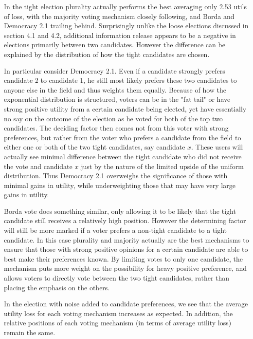 \documentclass[11pt]{scrartcl}
\begin{document}
In the tight election plurality actually performs the best averaging only 2.53 utils of loss, with the majority voting mechanism closely following, and Borda and Democracy 2.1 trailing behind. Surprisingly unlike the loose elections discussed in section 4.1 and 4.2, additional information release appears to be a negative in elections primarily between two candidates. However the difference can be explained by the distribution of how the tight candidates are chosen.

In particular consider Democracy 2.1. Even if a candidate strongly prefers candidate 2 to candidate 1, he still most likely prefers these two candidates to anyone else in the field and thus weights them equally.  Because of how the exponential distribution is structured, voters can be in the "fat tail" or have strong positive utility from a certain candidate being elected, yet have essentially no say on the outcome of the election as he voted for both of the top two candidates. The deciding factor then comes not from this voter with strong preferences, but rather from the voter who prefers a candidate from the field to either one or both of the two tight candidates, say candidate $x$. These users will actually see minimal difference between the tight candidate who did not receive the vote and candidate $x$ just by the nature of the limited upside of the uniform distribution. Thus Democracy 2.1 overweighs the significance of those with minimal gains in utility, while underweighting those that may have very large gains in utility.

Borda vote does something similar, only allowing it to be likely that the tight candidate still receives a relatively high position. However the determining factor will still be more marked if a voter prefers a non-tight candidate to a tight candidate. In this case plurality and majority actually are the best mechanisms to ensure that those with strong positive opinions for a certain candidate are able to best make their preferences known. By limiting votes to only one candidate, the mechanism puts more weight on the possibility for heavy positive preference, and allows voters to directly vote between the two tight candidates, rather than placing the emphasis on the others.

In the election with noise added to candidate preferences, we see that the average utility loss for each voting mechanism increases as expected. In addition, the relative positions of each voting mechanism (in terms of average utility loss) remain the same. 
\end{document}

